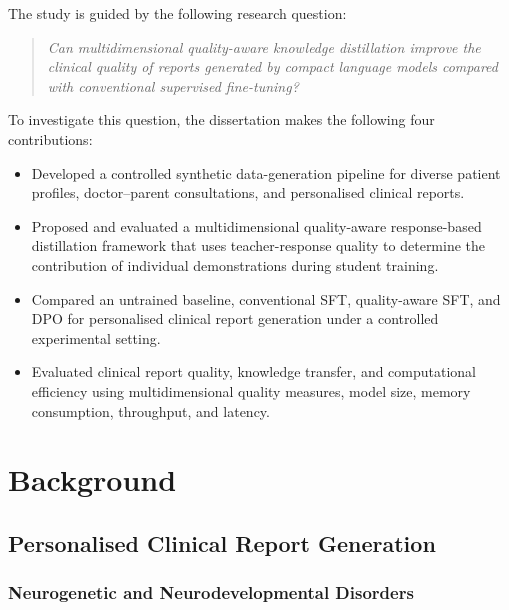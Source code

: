 \documentclass[ %
                    author={Aman Kumar Singh},
                supervisor={Dr. Edwin Simpson},
                    degree={MSc},
                     title={Quality-Aware Knowledge Distillation of Large Language Models for Efficient Personalised Clinical Report Generation},
                  subtitle={},
                      type={},
                      year={2021}]{dissertation}
\begin{document}
The study is guided by the following research question:
\vspace{-0.2em}
\begin{quote}
\textit{Can multidimensional quality-aware knowledge distillation improve the
clinical quality of reports generated by compact language models compared
with conventional supervised fine-tuning?}
\end{quote}
\vspace{-0.2em}
To investigate this question, the dissertation makes the following four
contributions:

\begin{itemize}[noitemsep, topsep=2pt, leftmargin=*]

    \item Developed a controlled synthetic data-generation pipeline for diverse patient profiles, doctor--parent consultations, and personalised clinical reports.

    \item Proposed and evaluated a multidimensional quality-aware response-based distillation framework that uses teacher-response quality to determine the contribution of individual demonstrations during student training.

    \item Compared an untrained baseline, conventional SFT, quality-aware SFT, and DPO for personalised clinical report generation under a controlled experimental setting.

    \item Evaluated clinical report quality, knowledge transfer, and computational efficiency using multidimensional quality measures, model size, memory consumption, throughput, and latency.
\end{itemize}



\chapter{Background}
\label{chap:background}
\section{Personalised Clinical Report Generation}
\label{sec:personalised_clinical_report_generation}

\subsection{Neurogenetic and Neurodevelopmental Disorders}
\label{sec:neurogenetic_disorders}
\end{document}
